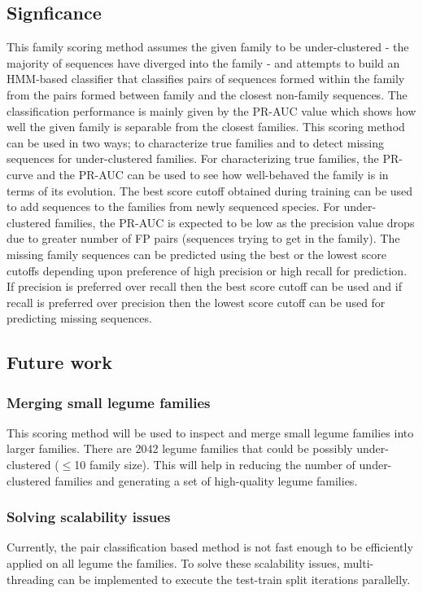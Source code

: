 \documentclass{article}
\begin{document}
		\subsection{Signficance}
		This family scoring method assumes the given family to be under-clustered - the majority of sequences have diverged into the family - and attempts to build an HMM-based classifier that classifies pairs of sequences formed within the family from the pairs formed between family and the closest non-family sequences. The classification performance is mainly given by the PR-AUC value which shows how well the given family is separable from the closest families. This scoring method can be used in two ways; to characterize true families and to detect missing sequences for under-clustered families. For characterizing true families, the PR-curve and the PR-AUC can be used to see how well-behaved the family is in terms of its evolution. The best score cutoff obtained during training can be used to add sequences to the families from newly sequenced species. For under-clustered families, the PR-AUC is expected to be low as the precision value drops due to greater number of FP pairs (sequences trying to get in the family). The missing family sequences can be predicted using the best or the lowest score cutoffs depending upon preference of  high precision or high recall for prediction. If precision is preferred over recall then the best score cutoff can be used and if recall is preferred over precision then the lowest score cutoff can be used for predicting missing sequences.
		
		\subsection{Future work}
			\subsubsection{Merging small legume families}
			This scoring method will be used to inspect and merge small legume families into larger families. There are 2042 legume families that could be possibly under-clustered ($\leq$10 family size). This will help in reducing the number of under-clustered families and generating a set of high-quality legume families.
			
			\subsubsection{Solving scalability issues}
			Currently, the pair classification based method is not fast enough to be efficiently applied on all legume the families. To solve these scalability issues, multi-threading can be implemented to execute the test-train split iterations parallelly. 
			
\end{document}
